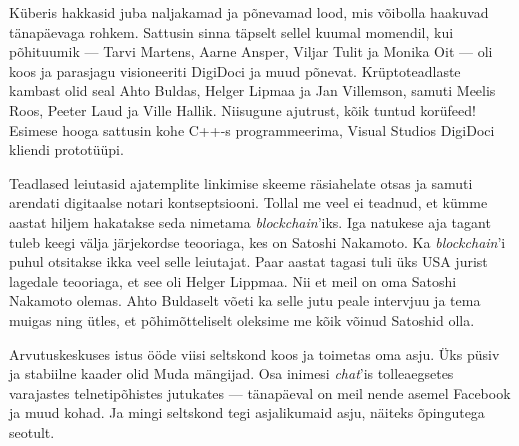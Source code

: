 Küberis hakkasid juba naljakamad ja põnevamad 
lood, mis võibolla haakuvad tänapäevaga rohkem. Sattusin 
sinna täpselt sellel kuumal momendil, kui põhituumik --- Tarvi 
Martens, Aarne Ansper, 
Viljar Tulit ja Monika Oit 
--- oli koos ja parasjagu visioneeriti DigiDoci ja muud põnevat. Krüptoteadlaste kambast olid seal Ahto 
Buldas, Helger Lipmaa ja Jan 
Villemson, samuti
Meelis Roos, Peeter Laud ja Ville Hallik. Niisugune ajutrust, kõik tuntud korüfeed! 
Esimese hooga sattusin kohe C++-s programmeerima, 
Visual Studios DigiDoci kliendi prototüüpi. 

Teadlased leiutasid ajatemplite linkimise skeeme 
räsiahelate otsas ja samuti arendati digitaalse notari kontseptsiooni. Tollal me veel ei teadnud, et kümme aastat hiljem 
hakatakse seda nimetama \emph{blockchain}'iks. Iga natukese aja tagant tuleb keegi 
välja järjekordse teooriaga, kes on Satoshi Nakamoto. Ka \emph{blockchain}'i puhul otsitakse ikka veel selle leiutajat. Paar aastat 
tagasi tuli üks USA jurist 
lagedale teooriaga, et see oli Helger Lippmaa. Nii et meil on oma 
Satoshi Nakamoto olemas. Ahto Buldaselt võeti ka 
selle jutu peale intervjuu ja tema muigas ning ütles, et põhimõtteliselt oleksime me kõik 
võinud Satoshid olla. 


Arvutuskeskuses istus ööde viisi seltskond koos 
ja toimetas oma asju. Üks püsiv ja stabiilne kaader olid 
Muda mängijad. Osa inimesi \emph{chat}'is 
tolleaegsetes varajastes telnetipõhistes jutukates --- 
tänapäeval on meil nende asemel Facebook ja muud kohad. Ja mingi seltskond tegi asjalikumaid asju, näiteks õpingutega seotult. 


